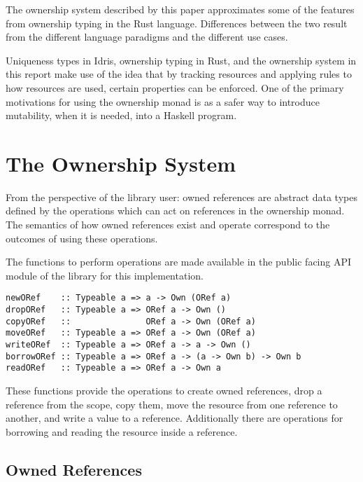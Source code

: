 \documentclass[onehalf,11pt]{beavtex}
\begin{document}
The ownership system described by this paper approximates some of the
features from ownership typing in the Rust language. Differences between
the two result from the different language paradigms and the different use
cases.

Uniqueness types in Idris, ownership typing in Rust, and the ownership system in
this report make use of the idea that by tracking resources and applying rules
to how resources are used, certain properties can be enforced.
One of the primary motivations for using the ownership monad is as a
safer way to introduce mutability, when it is needed, into a Haskell program.


\section{The Ownership System}

From the perspective of the library user: owned references are abstract
data types defined by the operations which can act on references in the
ownership monad.
The semantics of how owned references exist and operate correspond to the
outcomes of using these operations.

The functions to perform operations are made available in the public facing API
module of the library for this implementation.

\begin{verbatim}
newORef    :: Typeable a => a -> Own (ORef a)
dropORef   :: Typeable a => ORef a -> Own ()
copyORef   ::               ORef a -> Own (ORef a)
moveORef   :: Typeable a => ORef a -> Own (ORef a)
writeORef  :: Typeable a => ORef a -> a -> Own ()
borrowORef :: Typeable a => ORef a -> (a -> Own b) -> Own b
readORef   :: Typeable a => ORef a -> Own a
\end{verbatim}

These functions provide the operations to create owned references,
drop a reference from the scope, copy them, move the resource from one reference
to another,  and write a value to a reference.
Additionally there are operations for borrowing and reading the resource inside
a reference.

\subsection{Owned References}
\end{document}
